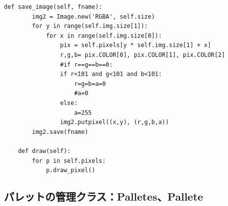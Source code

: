 \documentclass[uplatex,a4paper,11pt,oneside,openany]{jsbook}
\begin{document}
\begin{lstlisting}[caption=class Pixels,label=pr06]
    def save_image(self, fname):
        img2 = Image.new('RGBA', self.size)
        for y in range(self.img.size[1]):
            for x in range(self.img.size[0]):
                pix = self.pixels[y * self.img.size[1] + x]
                r,g,b= pix.COLOR[0], pix.COLOR[1], pix.COLOR[2]
                #if r==g==b==0:
                if r<101 and g<101 and b<101:
                    r=g=b=a=0
                    #a=0
                else:
                    a=255
                img2.putpixel((x,y), (r,g,b,a))
        img2.save(fname)

    def draw(self):
        for p in self.pixels:
            p.draw_pixel()
\end{lstlisting}

\subsection{パレットの管理クラス：Palletes、Pallete}
\end{document}
